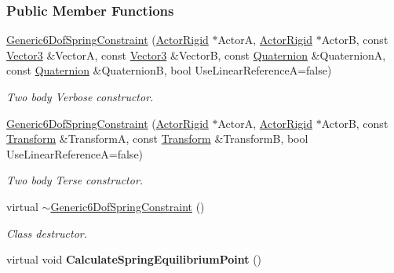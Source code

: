 \subsubsection*{Public Member Functions}
\begin{DoxyCompactItemize}
\item 
\hyperlink{classMezzanine_1_1Generic6DofSpringConstraint_a5f6ae308296bba7226957301117dbe7a}{Generic6DofSpringConstraint} (\hyperlink{classMezzanine_1_1ActorRigid}{ActorRigid} $\ast$ActorA, \hyperlink{classMezzanine_1_1ActorRigid}{ActorRigid} $\ast$ActorB, const \hyperlink{classMezzanine_1_1Vector3}{Vector3} \&VectorA, const \hyperlink{classMezzanine_1_1Vector3}{Vector3} \&VectorB, const \hyperlink{classMezzanine_1_1Quaternion}{Quaternion} \&QuaternionA, const \hyperlink{classMezzanine_1_1Quaternion}{Quaternion} \&QuaternionB, bool UseLinearReferenceA=false)
\begin{DoxyCompactList}\small\item\em Two body Verbose constructor. \item\end{DoxyCompactList}\item 
\hyperlink{classMezzanine_1_1Generic6DofSpringConstraint_a5fa0596a4bc966d286bf9b21982717d1}{Generic6DofSpringConstraint} (\hyperlink{classMezzanine_1_1ActorRigid}{ActorRigid} $\ast$ActorA, \hyperlink{classMezzanine_1_1ActorRigid}{ActorRigid} $\ast$ActorB, const \hyperlink{classMezzanine_1_1Transform}{Transform} \&TransformA, const \hyperlink{classMezzanine_1_1Transform}{Transform} \&TransformB, bool UseLinearReferenceA=false)
\begin{DoxyCompactList}\small\item\em Two body Terse constructor. \item\end{DoxyCompactList}\item 
virtual \hyperlink{classMezzanine_1_1Generic6DofSpringConstraint_ab64568bca388b19c4b81ff6bd8c6dc38}{$\sim$Generic6DofSpringConstraint} ()
\begin{DoxyCompactList}\small\item\em Class destructor. \item\end{DoxyCompactList}\item 
\hypertarget{classMezzanine_1_1Generic6DofSpringConstraint_a6f26a054060b9ab582b0f0d4e4e70701}{
virtual void {\bfseries CalculateSpringEquilibriumPoint} ()}
\label{classMezzanine_1_1Generic6DofSpringConstraint_a6f26a054060b9ab582b0f0d4e4e70701}


\end{DoxyCompactItemize}
